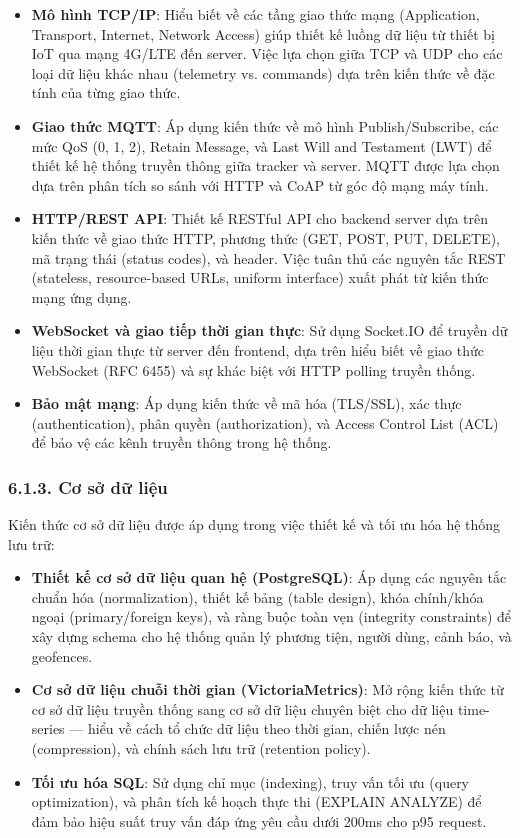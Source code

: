 \documentclass[13pt,a4paper]{extarticle}
\renewcommand{\\}{\thesislongtableorignewline\hline}%
\providecommand{\tightlist}{%
  \setlength{\itemsep}{0pt}\setlength{\parskip}{0pt}}
\begin{document}
\begin{itemize}
\tightlist
\item
  \textbf{Mô hình TCP/IP}: Hiểu biết về các tầng giao thức mạng
  (Application, Transport, Internet, Network Access) giúp thiết kế luồng
  dữ liệu từ thiết bị IoT qua mạng 4G/LTE đến server. Việc lựa chọn giữa
  TCP và UDP cho các loại dữ liệu khác nhau (telemetry vs. commands) dựa
  trên kiến thức về đặc tính của từng giao thức.
\item
  \textbf{Giao thức MQTT}: Áp dụng kiến thức về mô hình
  Publish/Subscribe, các mức QoS (0, 1, 2), Retain Message, và Last Will
  and Testament (LWT) để thiết kế hệ thống truyền thông giữa tracker và
  server. MQTT được lựa chọn dựa trên phân tích so sánh với HTTP và CoAP
  từ góc độ mạng máy tính.
\item
  \textbf{HTTP/REST API}: Thiết kế RESTful API cho backend server dựa
  trên kiến thức về giao thức HTTP, phương thức (GET, POST, PUT,
  DELETE), mã trạng thái (status codes), và header. Việc tuân thủ các
  nguyên tắc REST (stateless, resource-based URLs, uniform interface)
  xuất phát từ kiến thức mạng ứng dụng.
\item
  \textbf{WebSocket và giao tiếp thời gian thực}: Sử dụng Socket.IO để
  truyền dữ liệu thời gian thực từ server đến frontend, dựa trên hiểu
  biết về giao thức WebSocket (RFC 6455) và sự khác biệt với HTTP
  polling truyền thống.
\item
  \textbf{Bảo mật mạng}: Áp dụng kiến thức về mã hóa (TLS/SSL), xác thực
  (authentication), phân quyền (authorization), và Access Control List
  (ACL) để bảo vệ các kênh truyền thông trong hệ thống.
\end{itemize}

\subsubsection{6.1.3. Cơ sở dữ
liệu}\label{613-cux1a1-sux1edf-dux1eef-liux1ec7u}

Kiến thức cơ sở dữ liệu được áp dụng trong việc thiết kế và tối ưu hóa
hệ thống lưu trữ:

\begin{itemize}
\tightlist
\item
  \textbf{Thiết kế cơ sở dữ liệu quan hệ (PostgreSQL)}: Áp dụng các
  nguyên tắc chuẩn hóa (normalization), thiết kế bảng (table design),
  khóa chính/khóa ngoại (primary/foreign keys), và ràng buộc toàn vẹn
  (integrity constraints) để xây dựng schema cho hệ thống quản lý phương
  tiện, người dùng, cảnh báo, và geofences.
\item
  \textbf{Cơ sở dữ liệu chuỗi thời gian (VictoriaMetrics)}: Mở rộng kiến
  thức từ cơ sở dữ liệu truyền thống sang cơ sở dữ liệu chuyên biệt cho
  dữ liệu time-series --- hiểu về cách tổ chức dữ liệu theo thời gian,
  chiến lược nén (compression), và chính sách lưu trữ (retention
  policy).
\item
  \textbf{Tối ưu hóa SQL}: Sử dụng chỉ mục (indexing), truy vấn tối ưu
  (query optimization), và phân tích kế hoạch thực thi (EXPLAIN ANALYZE)
  để đảm bảo hiệu suất truy vấn đáp ứng yêu cầu dưới 200ms cho p95
  request.
\end{itemize}
\end{document}
